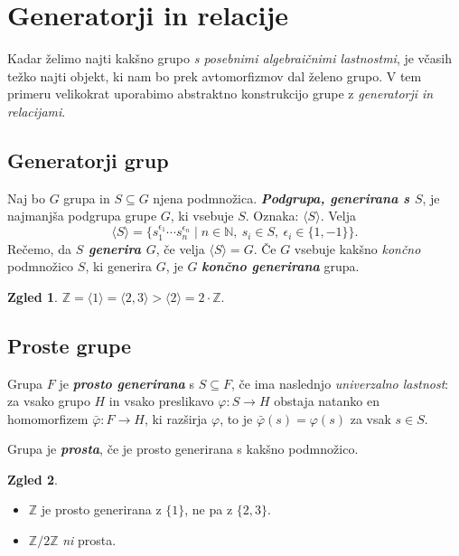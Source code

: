 \documentclass[11pt]{book}
\def\NN{\mathbb{N}}
\def\ZZ{\mathbb{Z}}
\def\definicija{\color{rdeca}\bf\em}
\theoremstyle{definition}
\theoremstyle{zgled}
\newtheorem*{zgled}{Zgled}
\theoremstyle{odprtproblem}
\theoremstyle{domacanaloga}
\theoremstyle{izrek}
\begin{document}
\section{Generatorji in relacije}

Kadar želimo najti kakšno grupo {\em s posebnimi algebraičnimi lastnostmi}, je včasih težko najti objekt, ki nam bo prek avtomorfizmov dal želeno grupo. V tem primeru velikokrat uporabimo abstraktno konstrukcijo grupe z {\em generatorji in relacijami}.

\subsection{Generatorji grup}

Naj bo $G$ grupa in $S \subseteq G$ njena podmnožica. {\definicija Podgrupa, generirana s $S$}, je najmanjša podgrupa grupe $G$, ki vsebuje $S$. Oznaka: $\langle S \rangle$. Velja 
\[
\langle S \rangle = \{ s_1^{\epsilon_1} \cdots s_n^{\epsilon_n} \mid n \in \NN, \ s_i \in S, \ \epsilon_i \in \{ 1, -1 \} \}.
\]
Rečemo, da {\definicija $S$ generira $G$}, če velja $\langle S \rangle = G$. Če $G$ vsebuje kakšno {\em končno} podmnožico $S$, ki generira $G$, je $G$ {\definicija končno generirana} grupa.

\begin{zgled}
$\ZZ = \langle 1 \rangle = \langle 2,3 \rangle > \langle 2 \rangle = 2 \cdot \ZZ$.
\end{zgled}

\subsection{Proste grupe}

Grupa $F$ je {\definicija prosto generirana} s $S \subseteq F$, če ima naslednjo {\em univerzalno lastnost}: za vsako grupo $H$ in vsako preslikavo $\varphi \colon S \to H$ obstaja natanko en homomorfizem $\bar \varphi \colon F \to H$, ki razširja $\varphi$, to je $\bar \varphi(s) = \varphi(s)$ za vsak $s \in S$.


Grupa je {\definicija prosta}, če je prosto generirana s kakšno podmnožico.

\begin{zgled}
\begin{itemize}
    \item $\ZZ$ je prosto generirana z $\{ 1 \}$, ne pa z $\{ 2, 3 \}$.
    \item $\ZZ/2\ZZ$ {\em ni} prosta.
\end{itemize}
\end{zgled}
\end{document}
